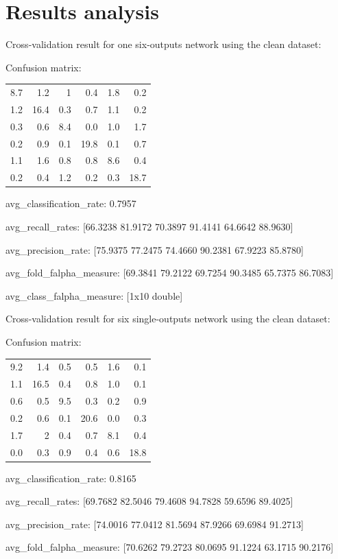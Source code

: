 \documentclass[a4wide, 11pt]{article}
\begin{document}
\section{Results analysis}
Cross-validation result for one six-outputs network using the clean dataset:

Confusion matrix:
\begin{tabular}{ r r r r r r }
 8.7 & 1.2 & 1 & 0.4 & 1.8 & 0.2 \\
 1.2 & 16.4 & 0.3 & 0.7 & 1.1 & 0.2 \\
 0.3 & 0.6 & 8.4 & 0.0 & 1.0 & 1.7 \\
 0.2 & 0.9 & 0.1 & 19.8 & 0.1 & 0.7 \\
 1.1 & 1.6 & 0.8 & 0.8 & 8.6 & 0.4 \\
 0.2 & 0.4 & 1.2 & 0.2 & 0.3 & 18.7 \\
\end{tabular}

avg\_classification\_rate: 0.7957

avg\_recall\_rates: {[}66.3238 81.9172 70.3897 91.4141 64.6642 88.9630{]}

avg\_precision\_rate: {[}75.9375 77.2475 74.4660 90.2381 67.9223 85.8780{]}

avg\_fold\_falpha\_measure: {[}69.3841 79.2122 69.7254 90.3485 65.7375 86.7083{]}

avg\_class\_falpha\_measure: {[}1x10 double{]}

Cross-validation result for six single-outputs network using the clean dataset:

Confusion matrix:
\begin{tabular}{ r r r r r r }
 9.2 & 1.4 & 0.5 & 0.5 & 1.6 & 0.1 \\
 1.1 & 16.5 & 0.4 & 0.8 & 1.0 & 0.1 \\
 0.6 & 0.5 & 9.5 & 0.3 & 0.2 & 0.9 \\
 0.2 & 0.6 & 0.1 & 20.6 & 0.0 & 0.3 \\
 1.7 & 2 & 0.4 & 0.7 & 8.1 & 0.4 \\
 0.0 & 0.3 & 0.9 & 0.4 & 0.6 & 18.8 \\
\end{tabular}

avg\_classification\_rate: 0.8165

avg\_recall\_rates: {[}69.7682 82.5046 79.4608 94.7828 59.6596 89.4025{]}

avg\_precision\_rate: {[}74.0016 77.0412 81.5694 87.9266 69.6984 91.2713{]}

avg\_fold\_falpha\_measure: {[}70.6262 79.2723 80.0695 91.1224 63.1715 90.2176{]}
\end{document}
